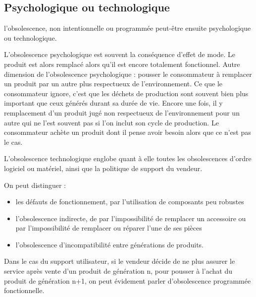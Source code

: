 \subsection{Psychologique ou technologique}

l’obsolescence, non intentionnelle ou programmée peut-être ensuite psychologique ou technologique. 

\bigbreak
L’obsolescence psychologique est souvent la conséquence d’effet de mode. Le produit est alors remplacé alors qu’il est encore totalement fonctionnel. Autre dimension de l’obsolescence psychologique : pousser le consommateur à remplacer un produit par un autre plus respectueux de l’environnement.
Ce que le consommateur ignore, c’est que les déchets de production sont souvent bien plus important que ceux générés durant sa durée de vie. Encore une fois, il y remplacement d’un produit jugé non respectueux de l’environnement pour un autre qui ne l’est souvent pas si l’on inclut son cycle de production. Le consommateur achète un produit dont il pense avoir besoin alors que ce n'est pas le cas.

\medbreak
L’obsolescence technologique englobe quant à elle toutes les obsolescences d’ordre logiciel ou matériel, ainsi que la politique de support du vendeur. 

On peut distinguer :
\begin{itemize}
  \item les défauts de fonctionnement, par l’utilisation de composants peu robustes
  \item l’obsolescence indirecte, de par l'impossibilité de remplacer un accessoire ou par l’impossibilité de remplacer ou réparer l’une de ses pièces
  \item l’obsolescence d’incompatibilité entre générations de produits.
\end{itemize}


\bigbreak
Dans le cas du support utilisateur, si le vendeur décide de ne plus assurer le service après vente d’un produit de génération n, pour pousser à l’achat du produit de génération n+1, on peut évidement parler d'obsolescence programmée fonctionnelle.